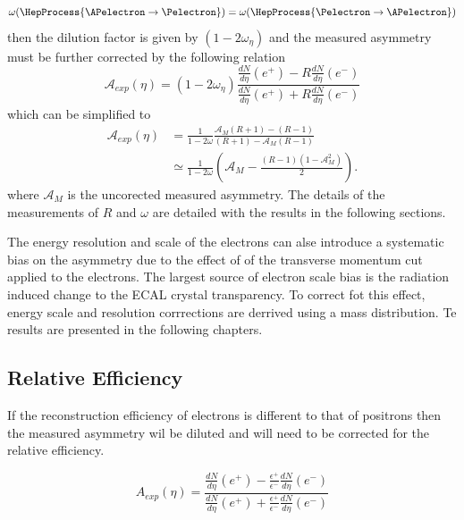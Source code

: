 \begin{equation}
  \omega( \HepProcess{\APelectron \to \Pelectron} ) =
  \omega( \HepProcess{\Pelectron \to \APelectron} )
\end{equation}
then the dilution factor is given by $(1-2\omega_\eta)$ and the measured
asymmetry must be further corrected by the following relation
\begin{equation}
  \mathcal{A}_{exp}(\eta) = (1-2\omega_\eta)
                \frac{
                    \frac{dN}{d\eta}(e^+)-
                    R\frac{dN}{d\eta}(e^-)
                }
                {
                    \frac{dN}{d\eta}(e^+)+
                    R\frac{dN}{d\eta}(e^-)
                }
\end{equation}
which can be simplified to
\begin{align*}
  \mathcal{A}_{exp}(\eta) 
  &=
  \frac{1}{1-2\omega}
  \frac{ \mathcal{A}_M\left(R+1\right) - \left(R-1\right)}
       {\left(R+1\right)-\mathcal{A}_M \left(R-1\right)}\\
  &\simeq 
  \frac{1}{1-2\omega}
  \left(\mathcal{A}_M
 -\frac{\left(R-1\right)\left(1-\mathcal{A}_M^2\right)}{2}\right).
\end{align*}
where $\mathcal{A}_M$ is the uncorected measured asymmetry. The details of the
measurements of $R$ and $\omega$  are detailed with the results in the following
sections.

The energy resolution and scale of the electrons can alse introduce a systematic
bias on the asymmetry due to the effect of of the transverse momentum cut
applied to the electrons. The largest source of electron scale bias is the
radiation induced change to the ECAL crystal transparency.
To correct fot this effect, energy scale and resolution corrrections are
derrived using a \Zee mass distribution. Te results are presented in the
following chapters.

\subsection{Relative Efficiency}

If the reconstruction efficiency of electrons is different to that of positrons
then the measured asymmetry wil be diluted and will need to be corrected for
the relative efficiency.

\begin{equation}
A_{exp}(\eta) = \frac{
                    \frac{dN}{d\eta}(e^+)-
                    \frac{\epsilon^+}{\epsilon^-}\frac{dN}{d\eta}(e^-)
                }
                {
                    \frac{dN}{d\eta}(e^+)+
                    \frac{\epsilon^+}{\epsilon^-}\frac{dN}{d\eta}(e^-)
                }
\end{equation}

